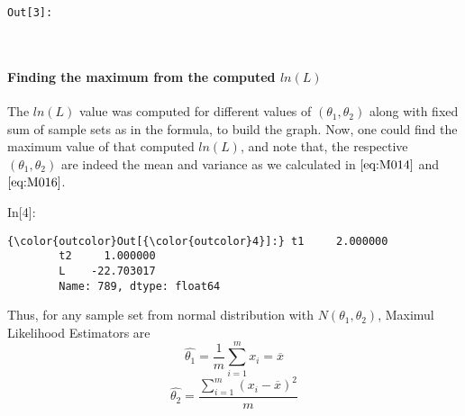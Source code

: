 \documentclass[float=false,crop=false]{standalone}
\begin{document}
    \texttt{\color{outcolor}Out[{\color{outcolor}3}]:}
    
    \begin{center}
    \end{center}
    { \hspace*{\fill} \\}
    

    \paragraph{\texorpdfstring{Finding the maximum from the computed
\(ln(L)\)}{Finding the maximum from the computed ln(L)}}\label{finding-the-maximum-from-the-computed-lnl}

The \(ln(L)\) value was computed for different values of
\((\theta_1,\theta_2)\) along with fixed sum of sample sets as in the
formula, to build the graph. Now, one could find the maximum value of
that computed \(ln(L)\), and note that, the respective
\((\theta_1,\theta_2)\) are indeed the mean and variance as we
calculated in \(\ref{eq:M014}\) and \(\ref{eq:M016}\).
\begin{InVerbatim}[commandchars=\\\{\},fontsize=\scriptsize]
{\color{incolor}In[{\color{incolor}4}]:} \PY{p}{[}\PY{p}{[}\PY{p}{]}\PY{p}{]}
\end{InVerbatim}
\begin{Verbatim}[commandchars=\\\{\}]
{\color{outcolor}Out[{\color{outcolor}4}]:} t1     2.000000
        t2     1.000000
        L    -22.703017
        Name: 789, dtype: float64
\end{Verbatim}
            \begin{tcolorbox}[colback=green!5,colframe=green!40!black,title=Normal Distribution]
Thus, for any sample set from normal distribution with $N(\theta_1,\theta_2)$, Maximul Likelihood Estimators are
\begin{equation}
    \hat{\theta_1} = \dfrac{1}{m}\sum_{i=1}^mx_i = \overline{x} \label{eq:M017} 
\end{equation}
\begin{equation}
    \hat{\theta_2} = \dfrac{ \sum_{i=1}^m(x_i-\overline{x})^2}{m} \label{eq:M018}
\end{equation}
\end{tcolorbox}

    
    
    
    
\end{document}
